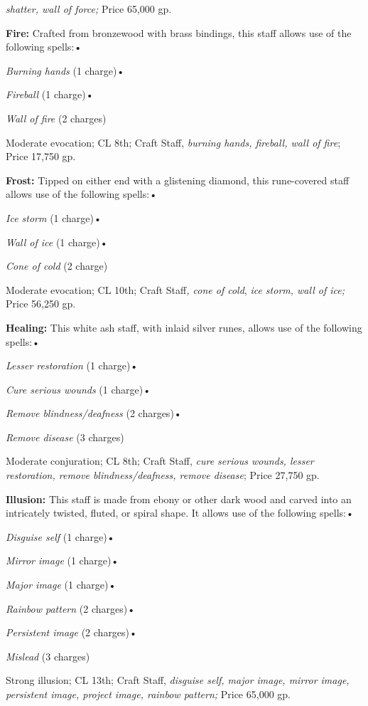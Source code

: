 \textit{shatter, wall of force; }Price 65,000 gp.

\textbf{Fire:} Crafted from bronzewood with brass bindings, this staff allows use 
of the following spells:•

\textit{Burning hands }(1 charge)•

\textit{Fireball }(1 charge)•

\textit{Wall of fire }(2 charges)

Moderate evocation; CL 8th; Craft Staff, \textit{burning hands, fireball, wall 
of fire}; Price 17,750 gp.

\textbf{Frost:} Tipped on either end with a glistening diamond, this rune-covered 
staff allows use of the following spells:•

\textit{Ice storm }(1 charge)•

\textit{Wall of ice }(1 charge)•

\textit{Cone of cold }(2 charge)

Moderate evocation; CL 10th; Craft Staff\textit{, cone of cold}, \textit{ice storm, 
wall of ice; }Price 56,250 gp.

\textbf{Healing: }This white ash staff, with inlaid silver runes, allows use of 
the following spells:•

\textit{Lesser restoration }(1 charge)•

\textit{Cure serious wounds }(1 charge)•

\textit{Remove blindness/deafness }(2 charges)•

\textit{Remove disease }(3 charges)

Moderate conjuration; CL 8th; Craft Staff, \textit{cure serious wounds, lesser 
restoration, remove blindness/deafness, remove disease}; Price 27,750 gp.

\textbf{Illusion:} This staff is made from ebony or other dark wood and carved 
into an intricately twisted, fluted, or spiral shape. It allows use of the following 
spells:•

\textit{Disguise self }(1 charge)•

\textit{Mirror image }(1 charge)•

\textit{Major image }(1 charge)•

\textit{Rainbow pattern }(2 charges)•

\textit{Persistent image }(2 charges)•

\textit{Mislead }(3 charges)

Strong illusion; CL 13th; Craft Staff, \textit{disguise self, major image, mirror 
image, persistent image, project image, rainbow pattern; }Price 65,000 gp.

